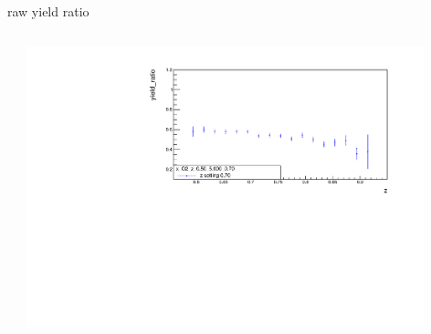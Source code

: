 \begin{frame}{raw yield ratio}
\begin{columns}
\begin{column}[T]{0.5\textwidth}
\end{column}
\begin{column}[T]{0.5\textwidth}
\includegraphics[width = 0.9\textwidth]{results/yield/statistics/x_Q2_z_0.50_5.000_0.70_ratio.pdf}
\end{column}
\end{columns}
\end{frame}
